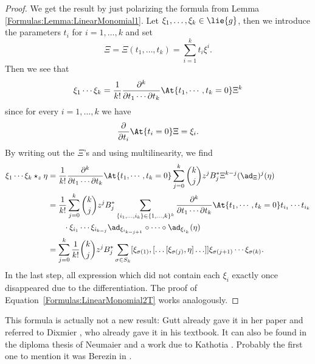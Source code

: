 \begin{proof}
	We get the result by just polarizing the formula from Lemma 
	\ref{Formulas:Lemma:LinearMonomial1}. Let $\xi_1, \ldots, \xi_k \in 
	\lie{g}$, then we introduce the parameters $t_i$ for $i = 
	1, \ldots, k$ and set
	\begin{equation*}
		\Xi
		=		
		\Xi(t_1, \ldots, t_k)
		=
		\sum\limits_{i=1}^k t_i \xi^i.
	\end{equation*}
	Then we see that
	\begin{equation*}
		\xi_1 \cdots \xi_k
		=
		\frac{1}{k!}
		\frac{\partial^k}{\partial t_1 \cdots \partial t_k}
		\At{t_1, \cdots, t_k = 0}
		\Xi^k
	\end{equation*}
	since for every $i = 1, \ldots, k$ we have
	\begin{equation}\label{Formulas:LittleHelp1}
		\frac{\partial}{\partial t_i}
		\At{t_i = 0} \Xi
		=
		\xi_i.
	\end{equation}
	By writing out the $\Xi$'s and using multilinearity, we find
	\begin{align*}
		\xi_1 \cdots \xi_k \star_z \eta
		& =
		\frac{1}{k!}
		\frac{\partial^k}{\partial t_1 \cdots \partial t_k}
		\At{t_1, \cdots, t_k = 0}
        \sum\limits_{j=0}^k
        \binom{k}{j} z^j B_j^*
        \Xi^{k-j}(\ad_{\Xi})^j (\eta)
        \\
        & =
		\frac{1}{k!}
        \sum\limits_{j=0}^k
        \binom{k}{j} z^j B_j^*
		\sum\limits_{
			\{i_1, \ldots, i_k\}
			\in
			\{1, \ldots, k\}^k
		}
		\frac{\partial^k}{\partial t_1 \cdots \partial t_k}
		\At{t_1, \cdots, t_k = 0}
        t_{i_1} \cdots t_{i_k}
        \\
        & \qquad
        \cdot
        \xi_{i_1} \cdots \xi_{i_{k-j}}
        \ad_{\xi_{i_{k-j+1}}} 
        \circ \cdots \circ  
        \ad_{\xi_{i_k}}
        (\eta)
        \\
        & =
    		\sum\limits_{j=0}^k
    		\frac{1}{k!} \binom{k}{j}
    		z^j B_j^*
    		\sum\limits_{\sigma \in S_k}
    		[\xi_{\sigma(1)}, 
    			[ \ldots [\xi_{\sigma(j)}, \eta] \ldots ]
    		]
    		\xi_{\sigma(j+1)} \cdots \xi_{\sigma(k)}.
	\end{align*}
	In the last step, all expression which did not contain each $\xi_i$ 
	exactly once disappeared due to the differentiation. The proof of 
	Equation~\ref{Formulas:LinearMonomial2T} works analogously.
\end{proof}
\begin{remark}
	\label{Formulas:Rem:EasierFormulaAlreadyKnown}
	This formula is actually not a new result: Gutt already gave it in her 
	paper \cite[Prop. 1]{gutt:1983a} and referred to Dixmier 
	\cite[part 2.8.12 (c)]{dixmier:1977a}, who already gave it in his 
	textbook. It can also be found in the diploma thesis of Neumaier 
	\cite[Rem. 5.2.8]{neumaier:1998a} and a work due to Kathotia 
	\cite[Eq. 2.23]{kathotia:1998a:pre}. Probably the first one to mention it 
	was Berezin in \cite[Eq. 30]{berezin:1967a}.
\end{remark}



